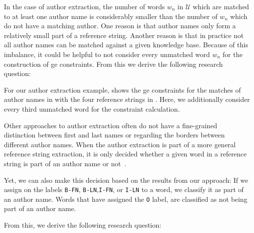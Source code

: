 \bigskip

In the case of author extraction, the number of words $w_n$ in $\mathcal{U}$ which are matched to at least one author name is considerably smaller than the number of $w_n$ which do not have a matching author.
One reason is that author names only form a relatively small part of a reference string.
Another reason is that in practice not all author names can be matched against a given knowledge base.
Because of this imbalance, it could be helpful to not consider every unmatched word $w_n$ for the construction of \gls{ge} constraints.
From this we derive the following research question:
\newcommand\researchquestionfour{}
\researchquestionfour%

For our author extraction example,  shows the \gls{ge} constraints for the matches of author names in  with the four reference strings in .
Here, we additionally consider every third unmatched word for the constraint calculation.

\bigskip

Other approaches to author extraction often do not have a fine-grained distinction between first and last names or regarding the borders between different author names.
When the author extraction is part of a more general reference string extraction, it is only decided whether a given word in a reference string is part of an author name or not~\citep[e.g.][]{chen1999gaussian,councill2008parscit,wu2014citeseerx,bellare2007learning}.

Yet, we can also make this decision based on the results from our approach:
If we assign on the labels \texttt{B-FN}, \texttt{B-LN},\texttt{I-FN}, or \texttt{I-LN} to a word, we classify it as part of an author name.
Words that have assigned the \texttt{O} label, are classified as not being part of an author name.

From this, we derive the following research question:
\newcommand\researchquestionfive{}
\researchquestionfive%


